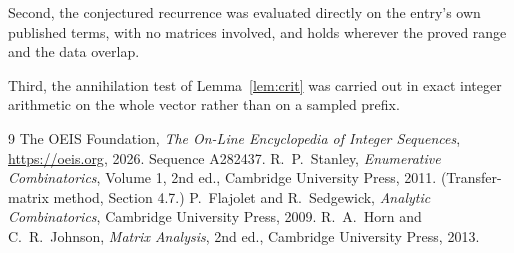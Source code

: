 \documentclass[11pt,a4paper]{article}
\theoremstyle{plain}
\theoremstyle{definition}
\begin{document}
Second, the conjectured recurrence was evaluated directly on the entry's own published terms,
with no matrices involved, and holds wherever the proved range and the data overlap.

Third, the annihilation test of Lemma~\ref{lem:crit} was carried out in exact integer
arithmetic on the whole vector rather than on a sampled prefix.

\begin{thebibliography}{9}
 The OEIS Foundation, \emph{The On-Line Encyclopedia of Integer
Sequences}, \url{https://oeis.org}, 2026. Sequence A282437.
 R.~P.~Stanley, \emph{Enumerative Combinatorics}, Volume 1, 2nd ed.,
Cambridge University Press, 2011. (Transfer-matrix method, Section 4.7.)
 P.~Flajolet and R.~Sedgewick, \emph{Analytic Combinatorics}, Cambridge
University Press, 2009.
 R.~A.~Horn and C.~R.~Johnson, \emph{Matrix Analysis}, 2nd ed., Cambridge
University Press, 2013.
\end{thebibliography}
\end{document}
